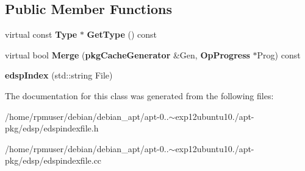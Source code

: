 \subsection*{\-Public \-Member \-Functions}
\begin{DoxyCompactItemize}
\item 
virtual const {\bf \-Type} $\ast$ {\bfseries \-Get\-Type} () const \label{classedspIndex_a97e9791ce2bb129d7b03dfe2f55de366}

\item 
virtual bool {\bfseries \-Merge} ({\bf pkg\-Cache\-Generator} \&\-Gen, {\bf \-Op\-Progress} $\ast$\-Prog) const \label{classedspIndex_a7055ce0e05b5bcf6fad25971d5e3c9e4}

\item 
{\bfseries edsp\-Index} (std\-::string \-File)\label{classedspIndex_a859ad8ca7af9b471313247617bbe97b1}

\end{DoxyCompactItemize}


\-The documentation for this class was generated from the following files\-:\begin{DoxyCompactItemize}
\item 
/home/rpmuser/debian/debian\-\_\-apt/apt-\/0..$\sim$exp12ubuntu10./apt-\/pkg/edsp/edspindexfile.\-h\item 
/home/rpmuser/debian/debian\-\_\-apt/apt-\/0..$\sim$exp12ubuntu10./apt-\/pkg/edsp/edspindexfile.\-cc\end{DoxyCompactItemize}

